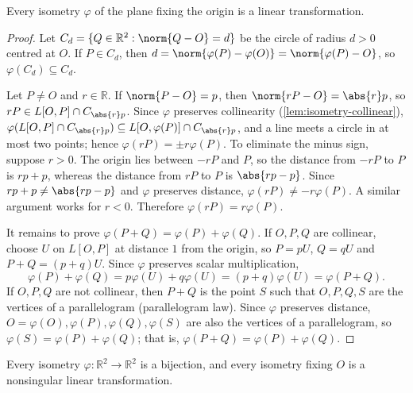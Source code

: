 \begin{proposition}\label{prop:isometry-linear}
	Every isometry \(\varphi\) of the plane fixing the origin is a linear transformation.
\end{proposition}

\begin{proof}
	Let \(C_d = \{Q \in \mathbb{R}^2 : \norm{Q - O} = d\}\) be the circle of radius
	\(d > 0\) centred at \(O\). If \(P \in C_d\), then
	\(d = \norm{\varphi(P) - \varphi(O)} = \norm{\varphi(P) - O}\), so
	\(\varphi(C_d) \subseteq C_d\).

	Let \(P \neq O\) and \(r \in \mathbb{R}\). If \(\norm{P - O} = p\), then
	\(\norm{rP - O} = \abs{r}p\), so \(rP \in L[O,P] \cap C_{\abs{r}p}\). Since \(\varphi\)
	preserves collinearity (\autoref{lem:isometry-collinear}),
	\(\varphi(L[O,P]\cap C_{\abs{r}p}) \subseteq L[O,\varphi(P)]\cap C_{\abs{r}p}\), and a
	line meets a circle in at most two points; hence
	\(\varphi(rP) = \pm r\varphi(P)\). To eliminate the minus sign, suppose \(r > 0\). The
	origin lies between \(-rP\) and \(P\), so the distance from \(-rP\) to \(P\) is
	\(rp + p\), whereas the distance from \(rP\) to \(P\) is \(\abs{rp - p}\). Since
	\(rp + p \neq \abs{rp-p}\) and \(\varphi\) preserves distance,
	\(\varphi(rP) \neq -r\varphi(P)\). A similar argument works for \(r < 0\). Therefore
	\(\varphi(rP) = r\varphi(P)\).

	It remains to prove \(\varphi(P+Q) = \varphi(P) + \varphi(Q)\). If \(O, P, Q\) are
	collinear, choose \(U\) on \(L[O,P]\) at distance \(1\) from the origin, so
	\(P = pU\), \(Q = qU\) and \(P + Q = (p+q)U\). Since \(\varphi\) preserves scalar
	multiplication,
	\[
		\varphi(P) + \varphi(Q) = p\varphi(U) + q\varphi(U) = (p+q)\varphi(U) = \varphi(P+Q).
	\]
	If \(O, P, Q\) are not collinear, then \(P + Q\) is the point \(S\) such that
	\(O, P, Q, S\) are the vertices of a parallelogram (parallelogram law). Since \(\varphi\)
	preserves distance, \(O = \varphi(O), \varphi(P), \varphi(Q), \varphi(S)\) are also the
	vertices of a parallelogram, so \(\varphi(S) = \varphi(P) + \varphi(Q)\); that is,
	\(\varphi(P+Q) = \varphi(P) + \varphi(Q)\).
\end{proof}

\begin{corollary}\label{cor:isometry-bijection}
	Every isometry \(\varphi\colon\mathbb{R}^2\to\mathbb{R}^2\) is a bijection, and every
	isometry fixing \(O\) is a nonsingular linear transformation.
\end{corollary}

